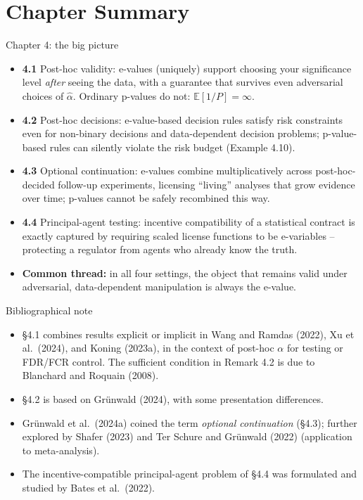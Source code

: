 \documentclass[aspectratio=169,10pt]{beamer}
\begin{document}
\section*{Chapter Summary}

\begin{frame}{Chapter 4: the big picture}
  \begin{itemize}
    \item \textbf{4.1} Post-hoc validity: e-values (uniquely) support
    choosing your significance level \emph{after} seeing the data, with a
    guarantee that survives even adversarial choices of $\hat\alpha$.
    Ordinary p-values do not: $\mathbb E[1/P]=\infty$.
    \item \textbf{4.2} Post-hoc decisions: e-value-based decision rules
    satisfy risk constraints even for non-binary decisions and
    data-dependent decision problems; p-value-based rules can silently
    violate the risk budget (Example 4.10).
    \item \textbf{4.3} Optional continuation: e-values combine
    multiplicatively across post-hoc-decided follow-up experiments,
    licensing ``living'' analyses that grow evidence over time; p-values
    cannot be safely recombined this way.
    \item \textbf{4.4} Principal-agent testing: incentive compatibility of a
    statistical contract is exactly captured by requiring scaled license
    functions to be e-variables -- protecting a regulator from agents who
    already know the truth.
    \item \textbf{Common thread:} in all four settings, the object that
    remains valid under adversarial, data-dependent manipulation is always
    the e-value.
  \end{itemize}
\end{frame}

\begin{frame}{Bibliographical note}
  \begin{itemize}
    \item \S4.1 combines results explicit or implicit in Wang and Ramdas
    (2022), Xu et al.\ (2024), and Koning (2023a), in the context of
    post-hoc $\alpha$ for testing or FDR/FCR control. The sufficient
    condition in Remark 4.2 is due to Blanchard and Roquain (2008).
    \item \S4.2 is based on Grünwald (2024), with some presentation
    differences.
    \item Grünwald et al.\ (2024a) coined the term \emph{optional
    continuation} (\S4.3); further explored by Shafer (2023) and Ter Schure
    and Grünwald (2022) (application to meta-analysis).
    \item The incentive-compatible principal-agent problem of \S4.4 was
    formulated and studied by Bates et al.\ (2022).
  \end{itemize}
\end{frame}
\end{document}
